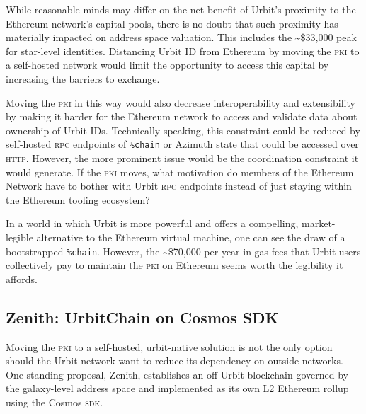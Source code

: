 \documentclass[twoside]{article}
\begin{document}
While reasonable minds may differ on the net benefit of Urbit's proximity to the Ethereum network's capital pools, there is no doubt that such proximity has materially impacted on address space valuation. This includes the \textasciitilde\$33,000 peak for star-level identities. Distancing Urbit ID from Ethereum by moving the \textsc{pki} to a self-hosted network would limit the opportunity to access this capital by increasing the barriers to exchange.

Moving the \textsc{pki} in this way would also decrease interoperability and extensibility by making it harder for the Ethereum network to access and validate data about ownership of Urbit IDs. Technically speaking, this constraint could be reduced by self-hosted \textsc{rpc} endpoints of \lstinline[style=inlinecode]{%chain} or Azimuth state that could be accessed over \textsc{http}. However, the more prominent issue would be the coordination constraint it would generate. If the \textsc{pki} moves, what motivation do members of the Ethereum Network have to bother with Urbit \textsc{rpc} endpoints instead of just staying within the Ethereum tooling ecosystem?

In a world in which Urbit is more powerful and offers a compelling, market-legible alternative to the Ethereum virtual machine, one can see the draw of a bootstrapped \lstinline[style=inlinecode]{%chain}. However, the \textasciitilde \$70,000 per year in gas fees that Urbit users collectively pay to maintain the \textsc{pki} on Ethereum seems worth the legibility it affords.

\subsection[Zenith:  UrbitChain on Cosmos \textsc{sdk}]{Zenith:  UrbitChain on Cosmos SDK}

Moving the \textsc{pki} to a self-hosted, urbit-native solution is not the only option should the Urbit network want to reduce its dependency on outside networks. One standing proposal, Zenith, establishes an off-Urbit blockchain governed by the galaxy-level address space and implemented as its own L2 Ethereum rollup using the Cosmos \textsc{sdk}.
\end{document}
